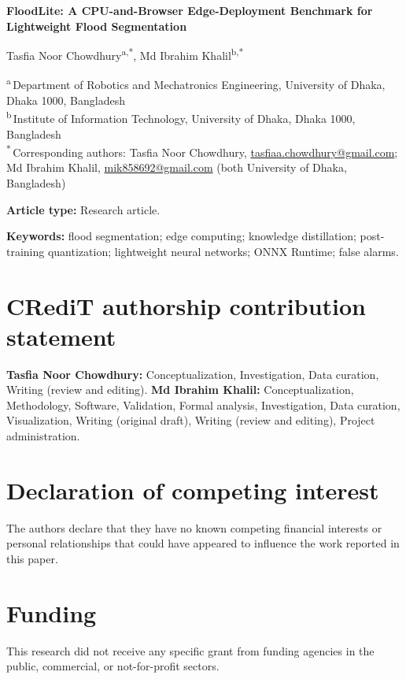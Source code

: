 \documentclass[12pt]{article}
\begin{document}
\begin{center}
{\Large\bfseries FloodLite: A CPU-and-Browser Edge-Deployment Benchmark for Lightweight Flood Segmentation\par}
\vspace{1.5em}
Tasfia Noor Chowdhury\textsuperscript{a,*}, Md Ibrahim Khalil\textsuperscript{b,*}
\end{center}

\vspace{0.5em}
\begin{flushleft}
\textsuperscript{a}\,Department of Robotics and Mechatronics Engineering, University of Dhaka, Dhaka 1000, Bangladesh\\
\textsuperscript{b}\,Institute of Information Technology, University of Dhaka, Dhaka 1000, Bangladesh\\[0.8em]
\textsuperscript{*}\,Corresponding authors: Tasfia Noor Chowdhury, \href{mailto:tasfiaa.chowdhury@gmail.com}{tasfiaa.chowdhury@gmail.com}; Md Ibrahim Khalil, \href{mailto:mik858692@gmail.com}{mik858692@gmail.com} (both University of Dhaka, Bangladesh)
\end{flushleft}

\textbf{Article type:} Research article.

\textbf{Keywords:} flood segmentation; edge computing; knowledge distillation; post-training quantization; lightweight neural networks; ONNX Runtime; false alarms.

\section*{CRediT authorship contribution statement}
\textbf{Tasfia Noor Chowdhury:} Conceptualization, Investigation, Data curation, Writing (review and editing).
\textbf{Md Ibrahim Khalil:} Conceptualization, Methodology, Software, Validation, Formal analysis, Investigation, Data curation, Visualization, Writing (original draft), Writing (review and editing), Project administration.

\section*{Declaration of competing interest}
The authors declare that they have no known competing financial interests or personal relationships that could have appeared to influence the work reported in this paper.

\section*{Funding}
This research did not receive any specific grant from funding agencies in the public, commercial, or not-for-profit sectors.
\end{document}
